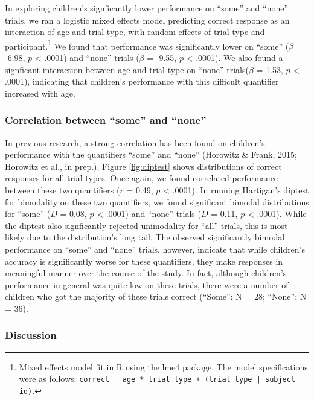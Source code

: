 \documentclass[10pt, letterpaper]{article}
\begin{document}
In exploring children's signficantly lower performance on ``some'' and
``none'' trials, we ran a logistic mixed effects model predicting
correct response as an interaction of age and trial type, with random
effects of trial type and
participant.\footnote{Mixed effects model fit in R using the lme4 package. The model specifications were as follows: \texttt{correct ~ age * trial type + (trial type | subject id)}.}
We found that performance was significantly lower on ``some'' (\(\beta\)
= -6.98, \(p\) \textless{} .0001) and ``none'' trials (\(\beta\) =
-9.55, \(p\) \textless{} .0001). We also found a signficant interaction
between age and trial type on ``none'' trials(\(\beta\) = 1.53, \(p\)
\textless{} .0001), indicating that children's performance with this
difficult quantifier increased with age.

\subsubsection{Correlation between ``some'' and
``none''}\label{correlation-between-some-and-none}

In previous research, a strong correlation has been found on children's
performance with the quantifiers ``some'' and ``none'' (Horowitz \&
Frank, 2015; Horowitz et al., in prep.). Figure \ref{fig:diptest} shows
distributions of correct responses for all trial types. Once again, we
found correlated performance between these two quantifiers (\(r\) =
0.49, \(p\) \textless{} .0001). In running Hartigan's diptest for
bimodality on these two quantifiers, we found significant bimodal
distributions for ``some'' (\(D\) = 0.08, \(p\) \textless{} .0001) and
``none'' trials (\(D\) = 0.11, \(p\) \textless{} .0001). While the
diptest also signficantly rejected unimodality for ``all'' trials, this
is most likely due to the distribution's long tail. The observed
significantly bimodal performance on ``some'' and ``none'' trials,
however, indicate that while children's accuracy is significantly worse
for these quantifiers, they make responses in meaningful manner over the
course of the study. In fact, although children's performance in general
was quite low on these trials, there were a number of children who got
the majority of these trials correct (``Some'': N = 28; ``None'': N =
36).

\subsubsection{Discussion}\label{discussion}
\end{document}
